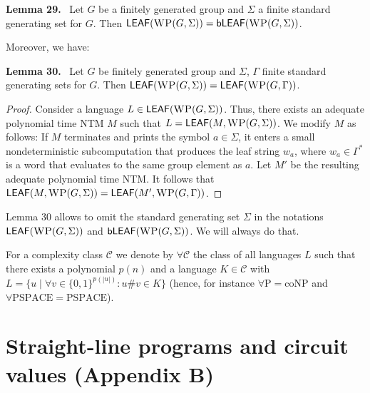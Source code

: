 \documentclass[10pt,a4paper]{article}
\newenvironment{authorclaim}[1]{\par\medskip\noindent\textbf{#1.}\ \ignorespaces}{\par\medskip}
\newcommand{\WP}{\textsc{WP}\xspace}
\newcommand{\LEAF}{\mathsf{LEAF}}
\newcommand{\bLEAF}{\mathsf{bLEAF}}
\begin{document}
\begin{authorclaim}{Lemma 29} \label{lemma-JMT}
Let $G$ be a finitely generated group and $\Sigma$ a finite standard generating set for $G$. 
Then $\LEAF(\WP(G,\Sigma))  = \bLEAF(\WP(G,\Sigma))$. 
\end{authorclaim}

Moreover, we have:
\begin{authorclaim}{Lemma 30} \label{lemma-f.g.set-not-important}
Let $G$ be finitely generated group and $\Sigma$, $\Gamma$ finite standard generating sets for $G$. 
Then $\LEAF(\WP(G,\Sigma))  = \LEAF(\WP(G,\Gamma))$. 
\end{authorclaim}

\begin{proof}
Consider a language $L \in \LEAF(\WP(G,\Sigma))$. Thus, there exists an adequate polynomial time
 NTM $M$ such that $L = \LEAF(M,\WP(G,\Sigma))$. We modify $M$ as follows: If $M$ terminates and prints
 the symbol $a \in \Sigma$, it enters a small nondeterministic subcomputation that produces the leaf string $w_a$,
 where $w_a \in \Gamma^*$ is a word that evaluates to the same group element as $a$. Let $M'$ be the resulting
 adequate polynomial time NTM.
 It follows that $\LEAF(M,\WP(G,\Sigma)) =  \LEAF(M',\WP(G,\Gamma))$.
\end{proof}
Lemma 30 allows to omit the standard generating set $\Sigma$ in the notations
$\LEAF(\WP(G,\Sigma))$ and $\bLEAF(\WP(G,\Sigma))$. We will always do that.

For a complexity class $\mathcal C$ we denote by $\forall\mathcal C$ the class of all languages $L$ such that there exists a polynomial $p(n)$ and a language $K\in\mathcal C$ with $L=\{u\mid\forall v\in\{0,1\}^{p(|u|)}:u\#v\in K\}$ (hence, for instance $\forall\mathrm P=\mathrm{coNP}$ and $\forall\mathrm{PSPACE}=\mathrm{PSPACE}$).

\section*{Straight-line programs and circuit values (Appendix B)}
\end{document}
